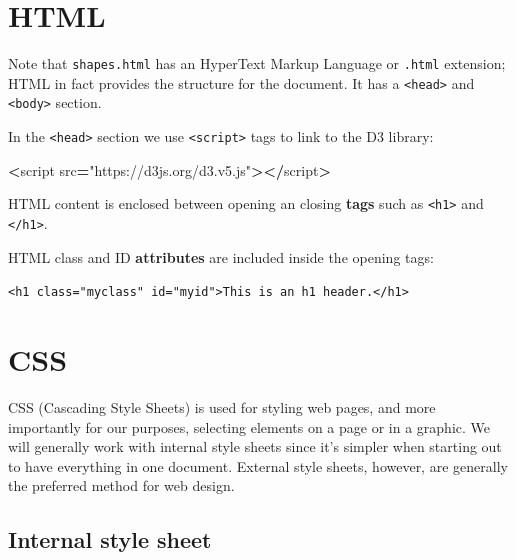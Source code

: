 \documentclass[
  openany]{book}
\newenvironment{Shaded}{\begin{snugshade}}{\end{snugshade}}
\newcommand{\NormalTok}[1]{#1}
\newcommand{\OperatorTok}[1]{\textcolor[rgb]{0.81,0.36,0.00}{\textbf{#1}}}
\newcommand{\StringTok}[1]{\textcolor[rgb]{0.31,0.60,0.02}{#1}}
\begin{document}
\hypertarget{html}{%
\section{\texorpdfstring{HTML }{HTML }}\label{html}}

Note that \texttt{shapes.html} has an HyperText Markup Language or \texttt{.html} extension; HTML in fact provides the structure for the document. It has a \texttt{\textless{}head\textgreater{}} and \texttt{\textless{}body\textgreater{}} section.

In the \texttt{\textless{}head\textgreater{}} section we use \texttt{\textless{}script\textgreater{}} tags to link to the D3 library:

\begin{Shaded}
\begin{Highlighting}[]
\OperatorTok{\textless{}}\NormalTok{script src}\OperatorTok{=}\StringTok{"https://d3js.org/d3.v5.js"}\OperatorTok{\textgreater{}\textless{}/}\NormalTok{script}\OperatorTok{\textgreater{}}
\end{Highlighting}
\end{Shaded}

HTML content is enclosed between opening an closing \textbf{tags} such as \texttt{\textless{}h1\textgreater{}} and \texttt{\textless{}/h1\textgreater{}}.

HTML class and ID \textbf{attributes} are included inside the opening tags:

\texttt{\textless{}h1\ class="myclass"\ id="myid"\textgreater{}This\ is\ an\ h1\ header.\textless{}/h1\textgreater{}}

\hypertarget{css}{%
\section{\texorpdfstring{CSS }{CSS }}\label{css}}

CSS (Cascading Style Sheets) is used for styling web pages, and more importantly for our purposes, selecting elements on a page or in a graphic. We will generally work with internal style sheets since it's simpler when starting out to have everything in one document. External style sheets, however, are generally the preferred method for web design.

\hypertarget{internal-style-sheet}{%
\subsection{Internal style sheet}\label{internal-style-sheet}}
\end{document}
